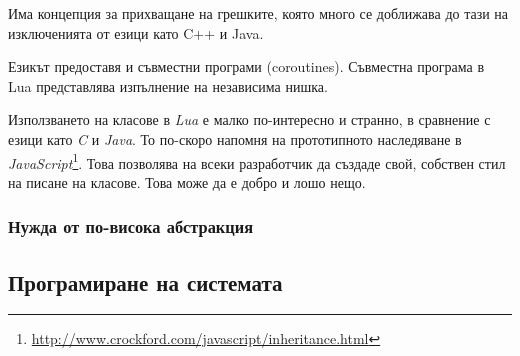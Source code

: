 								
				
				
				Има концепция за прихващане на грешките, която много се доближава до тази на изключенията от езици като
				C++ и Java.
				
				
				
				
				\newpage
				
				Езикът предоставя и съвместни програми (coroutines). Съвместна програма в Lua представлява изпълнение на независима нишка.
				
				
				
				
				
				\newpage
				
				Използването на класове в \emph{Lua} е малко по-интересно и странно, в сравнение с езици като \emph{C} и \emph{Java}. 
				То по-скоро напомня на прототипното наследяване в
				\emph{JavaScript}\footnote{\url{http://www.crockford.com/javascript/inheritance.html}}.
				Това позволява на всеки разработчик да създаде свой, собствен стил на писане на класове. Това може да е добро и лошо нещо.
				
				
				
								
		
		\subsubsection{Нужда от по-висока абстракция}
	\subsection{Програмиране на системата}